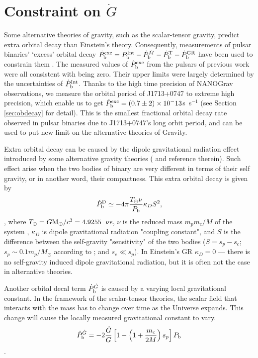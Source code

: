 \section{Constraint on $\dot{G}$}
\label{sec:Gdot}
Some alternative theories of gravity, such as the scalar-tensor gravity, predict extra orbital decay than Einstein's theory. 
Consequently, measurements of pulsar binaries' `excess' orbital decay
$\dot{P}_{\rm b}^{\rm exc}=\dot{P}_{\rm b}^{\rm Int} - \dot{P}_{\rm
b}^{\dot{M}}  - \dot{P}_{\rm b}^{\rm T} - \dot{P}_{\rm b}^{\rm GR}$ have been
used to constrain them \citep{lwj+09, fwe+12}. 
The measured values of $\dot{P}_{\rm b}^{\rm exc}$ from the pulsars of
previous work were all consistent with being zero. Their upper limits were largely determined by the uncertainties of $\dot{P}_{\rm b}^{\rm Int}$.
Thanks to the high time precision of NANOGrav observations, we measure the
orbital period of J1713+0747 to extreme high precision, which enable us to 
get $\dot{P}_{\rm b}^{\rm exc}=(0.7\pm2)\times10^-13$s~s$^{-1}$ (see Section
\ref{sec:obdecay} for detail). 
This is the smallest fractional orbital decay rate observed in pulsar binaries
due to J1713+0747's long orbit period, and can be used to put new limit on
the alternative theories of Gravity.

Extra orbital decay can be caused by the dipole gravitational radiation effect
introduced by some alternative gravity theories (\citealt{Will93, Will01, lwj+09, fwe+12} and reference therein). Such effect arise when the two bodies of binary are very different in terms of their self gravity, or in another word, their compactness.
This extra orbital decay is given by 
\begin{equation}
\dot{P}_{\rm b}^{\rm D} \simeq -4\pi\frac{T_{\odot}\nu}{P_{\rm b}}\kappa_D S^2,
\end{equation}
\citep{lwj+09}, where $T_{\odot}=G{\rm M_{\odot}}/c^3=4.9255$~${\rm \nu}$s, $\nu$ is the reduced mass $m_pm_c/M$ of the system , $\kappa_D $ is dipole
gravitational radiation "coupling constant", and $S$ is the difference
between the self-gravity "sensitivity" of the two bodies ($S = s_p - s_c$;
$s_p\sim0.1m_p/M_{\odot}$ according to \citealt{de92} ; and $s_c\ll s_p$).
In Einstein's GR $\kappa_D=0$ --- there is no self-gravity induced
dipole gravitational radiation, but it is often not the case in alternative
theories.

Another orbital decal term $\dot{P}_{\rm b}^{\dot{G}}$ is caused by a varying
local gravitational constant. In the framework of the scalar-tensor theories,
the scalar field that interacts with the mass has to change over time as the
Universe expands. This change will cause the locally measured gravitational
constant to vary. 
\begin{equation}
\dot{P}_{\rm b}^{\dot{G}} = -2 \frac{\dot{G}}{G}
\left[1-\left(1+\frac{m_c}{2M}\right)s_p\right]P_{\rm b}
\end{equation}
\citep{dgt88,nor90}.


